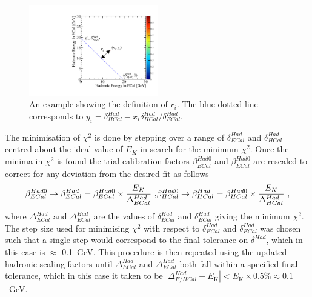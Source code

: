 %
\begin{figure}[h!]
\includegraphics[width=0.5\textwidth]{EnergyEstimators/Plots/Calibration/HadScaleSetting/HadScaleECalHCalSelectionExample.pdf}
\caption[An example showing the definition of $r_{i}$.  The blue dotted line corresponds to $y_{i} = \delta^{Had}_{HCal} - x_{i} \delta^{Had}_{HCal} / \delta^{Had}_{ECal}$.]{An example showing the definition of $r_{i}$.  The blue dotted line corresponds to $y_{i} = \delta^{Had}_{HCal} - x_{i} \delta^{Had}_{HCal} / \delta^{Had}_{ECal}$.}
\label{fig:hadscalechi2calc}
\end{figure}
%
\noindent The minimisation of $\chi^{2}$ is done by stepping over a range of $\delta^{Had}_{ECal}$ and $\delta^{Had}_{HCal}$ centred about the ideal value of $E_{K}$ in search for the minimum $\chi^{2}$.  Once the minima in $\chi^{2}$ is found the trial calibration factors $\beta^{Had0}_{ECal}$ and $\beta^{Had0}_{ECal}$ are rescaled to correct for any deviation from the desired fit as follows
%
\begin{equation}
\beta^{Had0}_{ECal} \rightarrow \beta^{Had}_{ECal} = \beta^{Had0}_{ECal} \times \frac{E_{K}}{\Delta^{Had}_{ECal}} \text{ ,}\\
\beta^{Had0}_{HCal} \rightarrow \beta^{Had}_{HCal} = \beta^{Had0}_{HCal} \times \frac{E_{K}}{\Delta^{Had}_{HCal}}\text{ ,}
\end{equation}
%
\noindent where $\Delta^{Had}_{ECal}$ and $\Delta^{Had}_{ECal}$ are the values of $\delta^{Had}_{ECal}$ and $\delta^{Had}_{ECal}$ giving the minimum $\chi^{2}$.  The step size used for minimising $\chi^{2}$ with respect to $\delta^{Had}_{ECal}$ and $\delta^{Had}_{ECal}$ was chosen such that a single step would correspond to the final tolerance on $\delta^{Had}$, which in this case is $\approx$ 0.1~GeV.  This procedure is then repeated using the updated hadronic scaling factors until $\Delta^{Had}_{ECal}$ and $\Delta^{Had}_{ECal}$ both fall within a specified final tolerance, which in this case it taken to be $|\Delta^{Had}_{E/HCal} - E_{\text{{K}}}| < E_{\text{{K}}} \times 0.5 \% \approx 0.1$~GeV.

